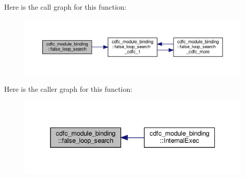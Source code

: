 Here is the call graph for this function\+:
\nopagebreak
\begin{figure}[H]
\begin{center}
\leavevmode
\includegraphics[width=350pt]{d9/dc4/classcdfc__module__binding_add730ae5e58ed2343e103075cb0c6b12_cgraph}
\end{center}
\end{figure}
Here is the caller graph for this function\+:
\nopagebreak
\begin{figure}[H]
\begin{center}
\leavevmode
\includegraphics[width=332pt]{d9/dc4/classcdfc__module__binding_add730ae5e58ed2343e103075cb0c6b12_icgraph}
\end{center}
\end{figure}
\mbox{\label{classcdfc__module__binding_a4979eecd53066cce0234ab4d42bca3a0}} 
